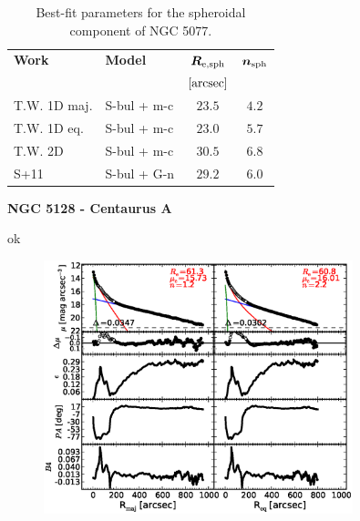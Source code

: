 \documentclass[preprint2]{emulateapj}
\newcommand{\fitfigurewidth}{0.8\textwidth}
\begin{document}
  \begin{table}[h]
  \small
  \caption{Best-fit parameters for the spheroidal component of NGC 5077.}
  \begin{center}
  \begin{tabular}{llcc}
  \hline
  {\bf Work} & {\bf Model}   & $\bm R_{\rm e,sph}$    & $\bm n_{\rm sph}$ \\
    &  &  $[\rm arcsec]$ & \\
  \hline
  T.W. 1D maj. & S-bul + m-c & $23.5$  &  $4.2$ \\
  T.W. 1D eq.  & S-bul + m-c & $23.0$  &  $5.7$ \\
  T.W. 2D      & S-bul + m-c & $30.5$  &  $6.8$ \\
  \hline
  S+11         & S-bul + G-n & $29.2$  &  $6.0$ \\
  \hline
  \end{tabular}
  \end{center}
  \label{tab:n5077}
  \end{table}


  \clearpage\newpage\noindent

  {\bf NGC 5128 - Centaurus A \\}

  ok

  \begin{figure}[h]
  \begin{center}
  \includegraphics[width=\fitfigurewidth]{images/n5128_1Dfit.eps}
  \caption{}
  \end{center}
  \end{figure}
\end{document}
